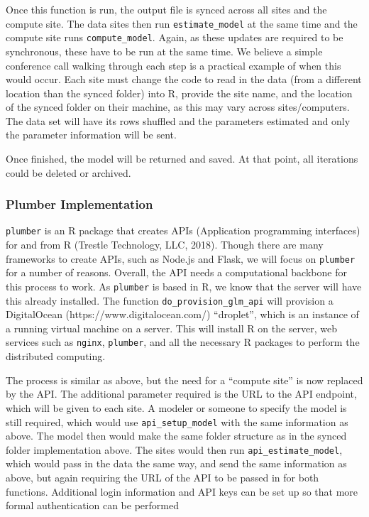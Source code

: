 \documentclass[]{elsarticle} %
\begin{document}
Once this function is run, the output file is synced across all sites
and the compute site. The data sites then run \texttt{estimate\_model}
at the same time and the compute site runs \texttt{compute\_model}.
Again, as these updates are required to be synchronous, these have to be
run at the same time. We believe a simple conference call walking
through each step is a practical example of when this would occur. Each
site must change the code to read in the data (from a different location
than the synced folder) into R, provide the site name, and the location
of the synced folder on their machine, as this may vary across
sites/computers. The data set will have its rows shuffled and the
parameters estimated and only the parameter information will be sent.

Once finished, the model will be returned and saved. At that point, all
iterations could be deleted or archived.

\hypertarget{plumber-implementation}{%
\subsubsection{Plumber Implementation}\label{plumber-implementation}}

\texttt{plumber} is an R package that creates APIs (Application
programming interfaces) for and from R (Trestle Technology, LLC, 2018).
Though there are many frameworks to create APIs, such as Node.js and
Flask, we will focus on \texttt{plumber} for a number of reasons.
Overall, the API needs a computational backbone for this process to
work. As \texttt{plumber} is based in R, we know that the server will
have this already installed. The function
\texttt{do\_provision\_glm\_api} will provision a DigitalOcean
(https://www.digitalocean.com/) ``droplet'', which is an instance of a
running virtual machine on a server. This will install R on the server,
web services such as \texttt{nginx}, \texttt{plumber}, and all the
necessary R packages to perform the distributed computing.

The process is similar as above, but the need for a ``compute site'' is
now replaced by the API. The additional parameter required is the URL to
the API endpoint, which will be given to each site. A modeler or someone
to specify the model is still required, which would use
\texttt{api\_setup\_model} with the same information as above. The model
then would make the same folder structure as in the synced folder
implementation above. The sites would then run
\texttt{api\_estimate\_model}, which would pass in the data the same
way, and send the same information as above, but again requiring the URL
of the API to be passed in for both functions. Additional login
information and API keys can be set up so that more formal
authentication can be performed
\end{document}
